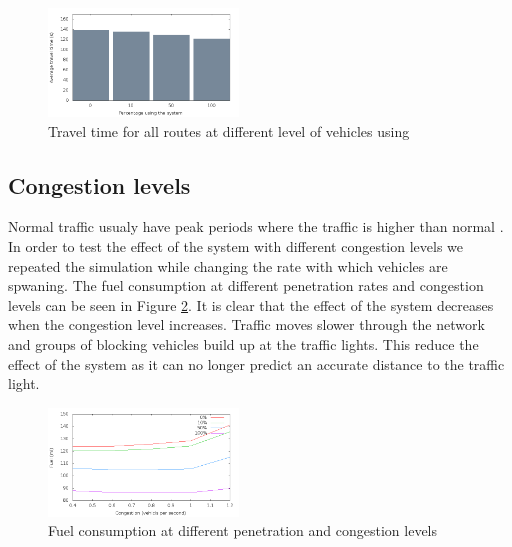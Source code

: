 \begin{figure}[htb]
\includegraphics[width=0.45\textwidth]{../images/tp0c0_8/combinedTime.png}
\caption{Travel time for all routes at different level of vehicles using \tech}
\label{fig:TestResults:combinedTime}
\end{figure}

\subsection{Congestion levels}
Normal traffic usualy have peak periods where the traffic is higher than normal \cite{Vejdir}. 
In order to test the effect of the system with different congestion levels we repeated the simulation while changing the rate with which vehicles are spwaning. 
The fuel consumption at different penetration rates and congestion levels can be seen in Figure \ref{fig:TestResults:congestionFuel}. 
It is clear that the effect of the system decreases when the congestion level increases. 
Traffic moves slower through the network and groups of blocking vehicles build up at the traffic lights. 
This reduce the effect of the system as it can no longer predict an accurate distance to the traffic light.
\begin{figure}[htb]
\includegraphics[width=0.45\textwidth]{../images/fuelCongestion.png}
\caption{Fuel consumption at different penetration and congestion levels}
\label{fig:TestResults:congestionFuel}
\end{figure}

